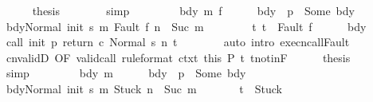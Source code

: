 \begin{isabellebody}
\ \ \ \ \isamarkupfalse%
\ {\isacharquery}thesis\isanewline
\ \ \ \ \ \ \isamarkupfalse%
\ simp\isanewline
\ \ \isamarkupfalse%
\isanewline
\ \ \ \ \isamarkupfalse%
\ bdy\ m\ f\isanewline
\ \ \ \ \isamarkupfalse%
\ bdy{\isacharcolon}\ {\isachardoublequoteopen}{\isasymGamma}\ p\ {\isacharequal}\ Some\ bdy{\isachardoublequoteclose}\isanewline
\ \ \ \ \isamarkupfalse%
\ {\isachardoublequoteopen}{\isasymGamma}{\isasymturnstile}{\isasymlangle}bdy{\isacharcomma}Normal\ {\isacharparenleft}init\ s{\isacharparenright}{\isasymrangle}\ {\isacharequal}m{\isasymRightarrow}\ Fault\ f{\isachardoublequoteclose}\ {\isachardoublequoteopen}n\ {\isacharequal}\ Suc\ m{\isachardoublequoteclose}\ \ \isanewline
\ \ \ \ \ \ t{\isacharcolon}\ {\isachardoublequoteopen}t\ {\isacharequal}\ Fault\ f{\isachardoublequoteclose}\isanewline
\ \ \ \ \isamarkupfalse%
\ bdy\ \isamarkupfalse%
\ {\isachardoublequoteopen}{\isasymGamma}{\isasymturnstile}{\isasymlangle}call\ init\ p\ return{\isacharprime}\ c\ {\isacharcomma}Normal\ s{\isasymrangle}\ {\isacharequal}n{\isasymRightarrow}\ t{\isachardoublequoteclose}\isanewline
\ \ \ \ \ \ \isamarkupfalse%
\ {\isacharparenleft}auto\ intro{\isacharcolon}\ execn{\isacharunderscore}callFault{\isacharparenright}\isanewline
\ \ \ \ \isamarkupfalse%
\ cnvalidD\ {\isacharbrackleft}OF\ valid{\isacharunderscore}call\ {\isacharbrackleft}rule{\isacharunderscore}format{\isacharbrackright}\ ctxt\ this\ P{\isacharbrackright}\ t\ t{\isacharunderscore}notin{\isacharunderscore}F\isanewline
\ \ \ \ \isamarkupfalse%
\ {\isacharquery}thesis\isanewline
\ \ \ \ \ \ \isamarkupfalse%
\ simp\isanewline
\ \ \isamarkupfalse%
\isanewline
\ \ \ \ \isamarkupfalse%
\ bdy\ m\isanewline
\ \ \ \ \isamarkupfalse%
\ bdy{\isacharcolon}\ {\isachardoublequoteopen}{\isasymGamma}\ p\ {\isacharequal}\ Some\ bdy{\isachardoublequoteclose}\isanewline
\ \ \ \ \isamarkupfalse%
\ {\isachardoublequoteopen}{\isasymGamma}{\isasymturnstile}{\isasymlangle}bdy{\isacharcomma}Normal\ {\isacharparenleft}init\ s{\isacharparenright}{\isasymrangle}\ {\isacharequal}m{\isasymRightarrow}\ Stuck{\isachardoublequoteclose}\ {\isachardoublequoteopen}n\ {\isacharequal}\ Suc\ m{\isachardoublequoteclose}\ \isanewline
\ \ \ \ \ \ {\isachardoublequoteopen}t\ {\isacharequal}\ Stuck{\isachardoublequoteclose}\isanewline
\ \ \ \ \isamarkupfalse%

\end{isabellebody}
